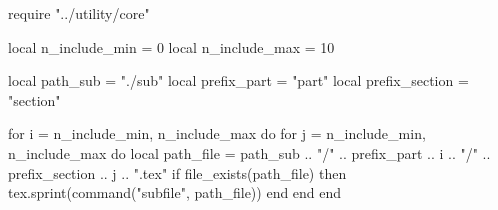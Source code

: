 \documentclass[11pt, a4paper]{ltjsarticle}
\date{\today}
\title{}
\author{}
\begin{document}
\maketitle
\tableofcontents

\begin{luacode*}
    require "../utility/core"

    local n_include_min = 0
    local n_include_max = 10

    local path_sub = "./sub"
    local prefix_part = "part"
    local prefix_section = "section"

    for i = n_include_min, n_include_max do
        for j = n_include_min, n_include_max do
            local path_file = path_sub .. "/" .. prefix_part .. i .. "/" .. prefix_section .. j .. ".tex"
            if file_exists(path_file) then
                tex.sprint(command("subfile", path_file))
            end
        end
    end
\end{luacode*}



\end{document}
